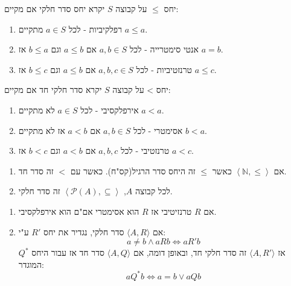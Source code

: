 \documentclass{tstextbook}
\begin{document}
\begin{definition}
יחס \(\leq\) על קבוצה \(S\) יקרא יחס סדר חלקי אם מקיים:

  \begin{enumerate}
    \item רפלקיביות - לכל \(a \in S\) מתקיים \(a \leq a\). 


    \item אנטי סימטרייה - לכל \(a,b \in S\) אם \(a\leq b\) וגם \(b\leq a\) אז \(a=b\).  


    \item טרנזטיביות - לכל \(a,b,c \in S\) אם \(a\leq b\) וגם \(b\leq c\) אז \(a\leq c\). 


  \end{enumerate}
\end{definition}
\begin{definition}
יחס > על קבוצה \(S\) יקרא סדר חלקי חד אם מקיים:

  \begin{enumerate}
    \item אירפלקסיבי - לכל \(a \in S\) לא מתקיים \(a< a\). 


    \item אסימטרי - לכל \(a,b \in S\) אם \(a< b\) אז לא מתקיים \(b < a\). 


    \item טרנזטיבי - לכל \(a,b,c\) אם \(a<b\) וגם \(b<c\) אז \(a< c\). 


  \end{enumerate}
\end{definition}
\begin{example}
  \begin{enumerate}
    \item אם \(\left\langle  \mathbb{N},\leq  \right\rangle\) כאשר \(\leq\) זה היחס סדר הרגיל(קס"ח). כאשר עם \(<\)  זה סדר חד. 


    \item לכל קבוצה \(A\), \(\left\langle  \mathcal{P}(A),\subseteq  \right\rangle\) זה סדר חלקי. 


  \end{enumerate}
\end{example}
\begin{remark}
  \begin{enumerate}
    \item אם \(R\) טרנזיטיבי אז \(R\) הוא אסימטרי אם"ם הוא אירפלקסיבי. 


    \item אם \(\langle A,R \rangle\) סדר חלקי, נגדיר את יחס \(R'\) ע"י: 
$$a\neq b\land aRb \iff a R' b$$
אז \(\langle A,R' \rangle\) זה סדר חלקי חד, ובאופן דומה, אם \(\langle A,Q \rangle\) סדר חד אז עבור היחס \(Q^*\) המוגדר:
$$aQ^*b \iff a=b\lor aQb$$


  \end{enumerate}
\end{remark}
\end{document}
